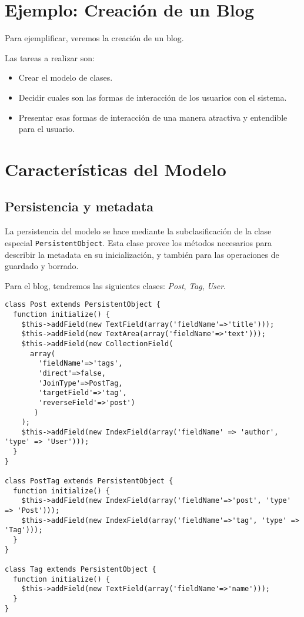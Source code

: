 \section{Ejemplo: Creación de un Blog}
Para ejemplificar, veremos la creación de un blog.

Las tareas a realizar son:
\begin{itemize}
\item Crear el modelo de clases.
\item Decidir cuales son las formas de interacción de los usuarios con el sistema.
\item Presentar esas formas de interacción de una manera atractiva y entendible para el usuario.
\end{itemize}

\section{Características del Modelo}

\subsection{Persistencia y metadata}
\label{sub-pers}

La persistencia del modelo se hace mediante la subclasificación de la clase especial \verb"PersistentObject".
Esta clase provee los métodos necesarios para describir la metadata en su inicialización, y también para las operaciones de guardado y borrado.

Para el blog, tendremos las siguientes clases: \emph{Post}, \emph{Tag}, \emph{User}.

\begin{verbatim}
class Post extends PersistentObject {
  function initialize() {
    $this->addField(new TextField(array('fieldName'=>'title')));
    $this->addField(new TextArea(array('fieldName'=>'text')));
    $this->addField(new CollectionField(
      array(
        'fieldName'=>'tags',
        'direct'=>false,
        'JoinType'=>PostTag,
        'targetField'=>'tag',
        'reverseField'=>'post')
       )
    );
    $this->addField(new IndexField(array('fieldName' => 'author', 'type' => 'User')));
  }
}

class PostTag extends PersistentObject {
  function initialize() {
    $this->addField(new IndexField(array('fieldName'=>'post', 'type' => 'Post')));
    $this->addField(new IndexField(array('fieldName'=>'tag', 'type' => 'Tag')));
  }
}

class Tag extends PersistentObject {
  function initialize() {
    $this->addField(new TextField(array('fieldName'=>'name')));
  }
}
\end{verbatim}

